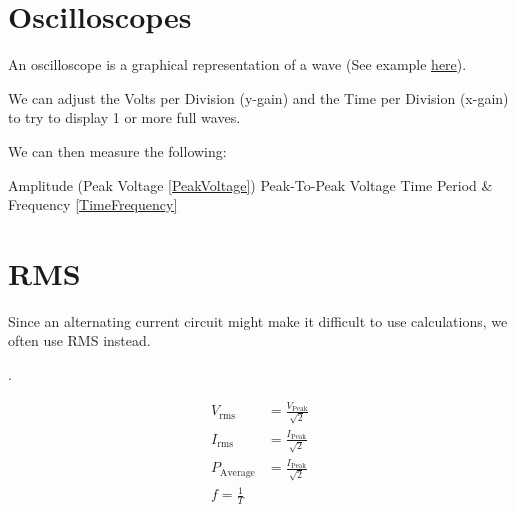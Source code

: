 
\section{Oscilloscopes}
An oscilloscope is a graphical representation of a wave (See example \href{https://academo.org/demos/virtual-oscilloscope/}{here}).

We can adjust the Volts per Division (y-gain) and the Time per Division (x-gain) to try to display 1 or more full waves.

We can then measure the following:
\begin{enumerate}
	\ii Amplitude (Peak Voltage \eqref{PeakVoltage})
	\ii Peak-To-Peak Voltage
	\ii Time Period \& Frequency \eqref{TimeFrequency}
	
\end{enumerate}

\section[Root Mean Squared]{RMS}
Since an alternating current circuit might make it difficult to use calculations, we often use RMS instead.

.

\begin{align}
	V_{\text{rms}} &= \frac{V_{\text{Peak}} \label{PeakVoltage}}{\sqrt{2}} \\
	I_{\text{rms}} &= \frac{I_{\text{Peak}}}{\sqrt{2}} \\
	P_{\text{Average}} &= \frac{I_{\text{Peak}}}{\sqrt{2}} \\
	f = \frac{1}{T} \label{TimeFrequency}
\end{align}
